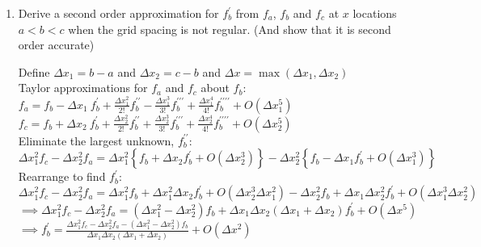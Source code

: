 {\begin{enumerate}
Taylor approximations for $f_{j+1}$ and $f_{j+2}$ about $f_{j}$:\\
$f_{j+1}=f_{j}+\Delta xf_{j}^{\prime}+\frac{\Delta x^{2}}{2!}f_{j}^{\prime\prime}+\frac{\Delta x^{3}}{3!}f_{j}^{\prime\prime\prime}+\frac{\Delta x^{4}}{4!}f_{j}^{\prime\prime\prime\prime}+O(\Delta x^{5})$\\
$f_{j+2}=f_{j}+2\Delta xf_{j}^{\prime}+2\Delta x^{2}f_{j}^{\prime\prime}+\frac{4\Delta x^{3}}{3}f_{j}^{\prime\prime\prime}+\frac{2\Delta x^{4}}{3}f_{j}^{\prime\prime\prime\prime}+O(\Delta x^{5})$\\
Eliminate the largest unknown, $f_{j}^{\prime}$ by calculating $f_{j+2}-2f_{j+1}$:\\
$f_{j+2}-2f_{j+1}=-f_{j}-\Delta x^{2}\ f_{j}^{\prime\prime}+O(\Delta x^{3})$\\
Rearrange to find $f_{j}^{\prime\prime}$:\\
$f_{j}^{\prime\prime}=\left(-f_{j+2}+2f_{j+1}-f_{j}\right)/\Delta x^{2}+O(\Delta x)$
\item Derive a second order approximation for $f_{b}^{\prime}$ from $f_{a}$,
$f_{b}$ and $f_{c}$ at $x$ locations $a<b<c$ when the grid spacing
is not regular. (And show that it is second order accurate)

Define $\Delta x_{1}=b-a$ and $\Delta x_{2}=c-b$ and $\Delta x=\max\left(\Delta x_{1},\Delta x_{2}\right)$\\
Taylor approximations for $f_{a}$ and $f_{c}$ about $f_{b}$:\\
$f_{a}=f_{b}-\Delta x_{1}\ f_{b}^{\prime}+\frac{\Delta x_{1}^{2}}{2!}f_{b}^{\prime\prime}-\frac{\Delta x_{1}^{3}}{3!}f_{b}^{\prime\prime\prime}+\frac{\Delta x_{1}^{4}}{4!}f_{b}^{\prime\prime\prime\prime}+O(\Delta x_{1}^{5})$
\\
$f_{c}=f_{b}+\Delta x_{2}\ f_{b}^{\prime}+\frac{\Delta x_{2}^{2}}{2!}f_{b}^{\prime\prime}+\frac{\Delta x_{2}^{3}}{3!}f_{b}^{\prime\prime\prime}+\frac{\Delta x_{2}^{4}}{4!}f_{b}^{\prime\prime\prime\prime}+O(\Delta x_{2}^{5})$\\
Eliminate the largest unknown, $f_{b}^{\prime\prime}$:\\
$\Delta x_{1}^{2}f_{c}-\Delta x_{2}^{2}f_{a}=\Delta x_{1}^{2}\left\{ f_{b}+\Delta x_{2}f_{b}^{\prime}+O(\Delta x_{2}^{3})\right\} -\Delta x_{2}^{2}\left\{ f_{b}-\Delta x_{1}f_{b}^{\prime}+O(\Delta x_{1}^{3})\right\} $\\
Rearrange to find $f_{b}^{\prime}$:\\
$\Delta x_{1}^{2}f_{c}-\Delta x_{2}^{2}f_{a}=\Delta x_{1}^{2}f_{b}+\Delta x_{1}^{2}\Delta x_{2}f_{b}^{\prime}+O(\Delta x_{2}^{3}\Delta x_{1}^{2})-\Delta x_{2}^{2}f_{b}+\Delta x_{1}\Delta x_{2}^{2}f_{b}^{\prime}+O(\Delta x_{1}^{3}\Delta x_{2}^{2})$\\
$\implies\Delta x_{1}^{2}f_{c}-\Delta x_{2}^{2}f_{a}=\left(\Delta x_{1}^{2}-\Delta x_{2}^{2}\right)f_{b}+\Delta x_{1}\Delta x_{2}\left(\Delta x_{1}+\Delta x_{2}\right)f_{b}^{\prime}+O(\Delta x^{5})$\\
$\implies f_{b}^{\prime}=\frac{\Delta x_{1}^{2}f_{c}-\Delta x_{2}^{2}f_{a}-\left(\Delta x_{1}^{2}-\Delta x_{2}^{2}\right)f_{b}}{\Delta x_{1}\Delta x_{2}\left(\Delta x_{1}+\Delta x_{2}\right)}+O(\Delta x^{2})$
\end{enumerate}
}

